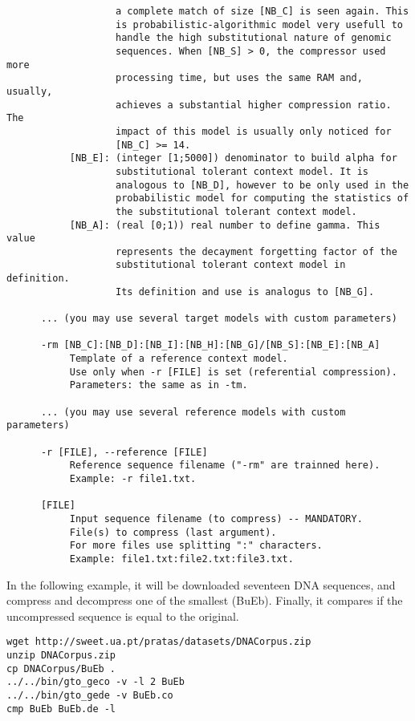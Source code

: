 \begin{lstlisting}
                   a complete match of size [NB_C] is seen again. This  
                   is probabilistic-algorithmic model very usefull to   
                   handle the high substitutional nature of genomic     
                   sequences. When [NB_S] > 0, the compressor used more 
                   processing time, but uses the same RAM and, usually, 
                   achieves a substantial higher compression ratio. The 
                   impact of this model is usually only noticed for     
                   [NB_C] >= 14.                                        
           [NB_E]: (integer [1;5000]) denominator to build alpha for    
                   substitutional tolerant context model. It is         
                   analogous to [NB_D], however to be only used in the  
                   probabilistic model for computing the statistics of  
                   the substitutional tolerant context model.           
           [NB_A]: (real [0;1)) real number to define gamma. This value 
                   represents the decayment forgetting factor of the    
                   substitutional tolerant context model in definition. 
                   Its definition and use is analogus to [NB_G].        
                                                                        
      ... (you may use several target models with custom parameters)    
                                                                        
      -rm [NB_C]:[NB_D]:[NB_I]:[NB_H]:[NB_G]/[NB_S]:[NB_E]:[NB_A]       
           Template of a reference context model.                       
           Use only when -r [FILE] is set (referential compression).    
           Parameters: the same as in -tm.                              
                                                                        
      ... (you may use several reference models with custom parameters) 
                                                                        
      -r [FILE], --reference [FILE]                                     
           Reference sequence filename ("-rm" are trainned here).     
           Example: -r file1.txt.                                       
                                                                        
      [FILE]                                                            
           Input sequence filename (to compress) -- MANDATORY.          
           File(s) to compress (last argument).                         
           For more files use splitting ":" characters.               
           Example: file1.txt:file2.txt:file3.txt.
\end{lstlisting}
In the following example, it will be downloaded seventeen DNA sequences, and compress and decompress one of the smallest (BuEb). Finally, it compares if the uncompressed sequence is equal to the original.
\begin{lstlisting}
wget http://sweet.ua.pt/pratas/datasets/DNACorpus.zip
unzip DNACorpus.zip
cp DNACorpus/BuEb .
../../bin/gto_geco -v -l 2 BuEb
../../bin/gto_gede -v BuEb.co 
cmp BuEb BuEb.de -l
\end{lstlisting}